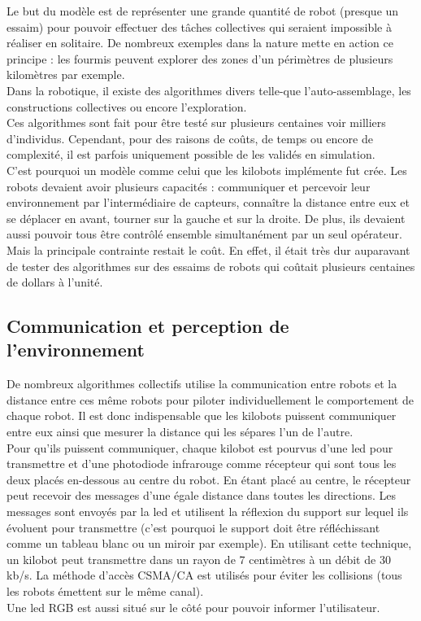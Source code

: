 \documentclass[a4paper,8pt]{report}
\begin{document}
Le but du mod\`ele est de repr\'esenter une grande quantit\'e de robot (presque un essaim) pour pouvoir effectuer des t\^aches collectives qui seraient impossible \`a r\'ealiser en solitaire. De nombreux exemples dans la nature mette en action ce principe : les fourmis peuvent explorer des zones d'un p\'erim\`etres de plusieurs kilom\`etres par exemple. \\
Dans la robotique, il existe des algorithmes divers telle-que l'auto-assemblage, les constructions collectives ou encore l'exploration.\\ 
Ces algorithmes sont fait pour \^etre test\'e sur plusieurs centaines voir milliers d'individus. Cependant, pour des raisons de co\^uts, de temps ou encore de complexit\'e, il est parfois uniquement possible de les valid\'es en simulation. \\
C'est pourquoi un mod\`ele comme celui que les kilobots impl\'emente fut cr\'ee. Les robots devaient avoir plusieurs capacit\'es : communiquer et percevoir leur environnement par l'interm\'ediaire de capteurs, conna\^itre la distance entre eux et se d\'eplacer en avant, tourner sur la gauche et sur la droite. De plus, ils devaient aussi pouvoir tous \^etre contr\^ol\'e ensemble simultan\'ement par un seul op\'erateur. Mais la principale contrainte restait le co\^ut. En effet, il \'etait tr\`es dur auparavant de tester des algorithmes sur des essaims de robots qui co\^utait plusieurs centaines de dollars \`a l'unit\'e.\\

\subsection*{Communication et perception de l'environnement}\label{subsec:name}

De nombreux algorithmes collectifs utilise la communication entre robots et la distance entre ces m\^eme robots pour piloter individuellement le comportement de chaque robot. Il est donc indispensable que les kilobots puissent communiquer entre eux ainsi que mesurer la distance qui les s\'epares l'un de l'autre. \\
Pour qu'ils puissent communiquer, chaque kilobot est pourvus d'une led pour transmettre et d'une photodiode infrarouge comme r\'ecepteur qui sont tous les deux plac\'es en-dessous au centre du robot. En \'etant plac\'e au centre, le r\'ecepteur peut recevoir des messages d'une \'egale distance dans toutes les directions. Les messages sont envoy\'es par la led et utilisent la r\'eflexion du support sur lequel ils \'evoluent pour transmettre (c'est pourquoi le support doit \^etre r\'efl\'echissant comme un tableau blanc ou un miroir par exemple). En utilisant cette technique, un kilobot peut transmettre dans un rayon de 7 centim\`etres \`a un d\'ebit de 30 kb/s. La m\'ethode d'acc\`es CSMA/CA est utilis\'es pour \'eviter les collisions (tous les robots \'emettent sur le m\^eme canal).\\
Une led RGB est aussi situ\'e sur le c\^ot\'e pour pouvoir informer l'utilisateur.\\
\end{document}
